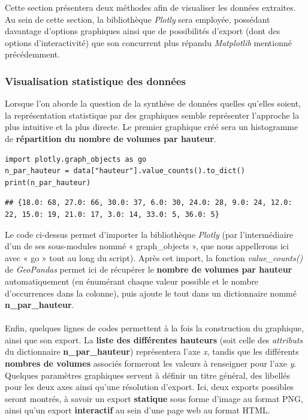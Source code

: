 \documentclass[
  11pt,
  french,
]{article}
\begin{document}
Cette section présentera deux méthodes afin de visualiser les données
extraites. Au sein de cette section, la bibliothèque \emph{Plotly} sera
employée, possédant davantage d'options graphiques ainsi que de
possibilités d'export (dont des options d'interactivité) que son
concurrent plus répandu \emph{Matplotlib} mentionné précédemment.

\newpage

\hypertarget{visualisation-statistique-des-donnuxe9es}{%
\subsubsection{Visualisation statistique des
données}\label{visualisation-statistique-des-donnuxe9es}}

Lorsque l'on aborde la question de la synthèse de données quelles
qu'elles soient, la représentation statistique par des graphiques semble
représenter l'approche la plus intuitive et la plus directe. Le premier
graphique créé sera un histogramme de \textbf{répartition du nombre de
volumes par hauteur}.

\begin{tcolorbox}[title= Import de plotly et obtention du nombre de volumes par hauteur ,colback=boitecode]
\begin{lstlisting}[style=code]
import plotly.graph_objects as go
n_par_hauteur = data["hauteur"].value_counts().to_dict()
print(n_par_hauteur)\end{lstlisting}
\begin{lstlisting}[style=out]
## {18.0: 68, 27.0: 66, 30.0: 37, 6.0: 30, 24.0: 28, 9.0: 24, 12.0: 22, 15.0: 19, 21.0: 17, 3.0: 14, 33.0: 5, 36.0: 5}
\end{lstlisting}
\end{tcolorbox}

Le code ci-dessus permet d'importer la bibliothèque \emph{Plotly} (par
l'intermédiaire d'un de ses sous-modules nommé « graph\_objects », que
nous appellerons ici avec « go » tout au long du script). Après cet
import, la fonction \emph{value\_counts()} de \emph{GeoPandas} permet
ici de récupérer le \textbf{nombre de volumes par hauteur}
automatiquement (en énumérant chaque valeur possible et le nombre
d'occurrences dans la colonne), puis ajoute le tout dans un dictionnaire
nommé \textbf{n\_par\_hauteur}.\\
~\\
Enfin, quelques lignes de codes permettent à la fois la construction du
graphique, ainsi que son export. La \textbf{liste des différentes
hauteurs} (soit celle des \emph{attributs} du dictionnaire
\textbf{n\_par\_hauteur}) représentera l'axe \emph{x}, tandis que les
différents \textbf{nombres de volumes} associés formeront les valeurs à
renseigner pour l'axe \emph{y}. Quelques paramètres graphiques servent à
définir un titre général, des libellés pour les deux axes ainsi qu'une
résolution d'export. Ici, deux exports possibles seront montrés, à
savoir un export \textbf{statique} sous forme d'image au format PNG,
ainsi qu'un export \textbf{interactif} au sein d'une page web au format
HTML.
\end{document}

